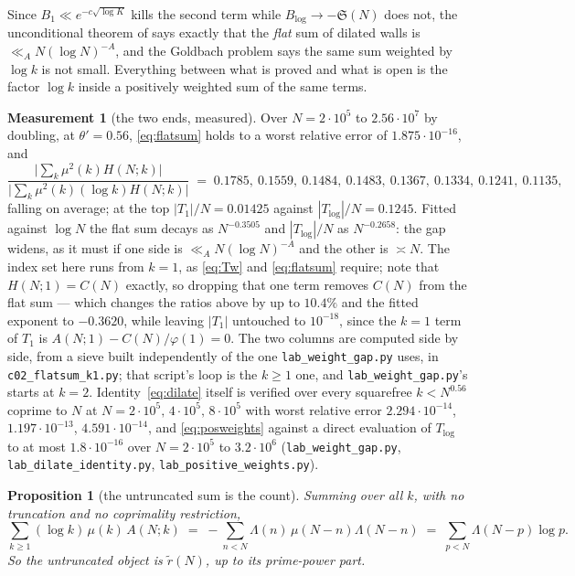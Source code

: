 \documentclass[11pt,a4paper]{article}
\theoremstyle{plain}
\newtheorem{proposition}[theorem]{Proposition}
\theoremstyle{definition}
\newtheorem{measurement}[theorem]{Measurement}
\theoremstyle{remark}
\renewcommand{\SS}{\mathfrak{S}}
\begin{document}
Since $B_1\ll e^{-c\sqrt{\log K}}$ kills the second term while
$B_{\log}\to-\SS(N)$ does not, the unconditional theorem of \cite{P1}
says exactly that the \emph{flat} sum of dilated walls is
$\ll_AN(\log N)^{-A}$, and the Goldbach problem says the same sum
weighted by $\log k$ is not small. Everything between what is proved
and what is open is the factor $\log k$ inside a positively weighted
sum of the same terms.

\begin{measurement}[the two ends, measured]\label{meas:flatsum}
Over $N=2\cdot10^5$ to $2.56\cdot10^7$ by doubling, at
$\theta'=0.56$, \eqref{eq:flatsum} holds to a worst relative error of
$1.875\cdot10^{-16}$, and
\[
  \frac{\bigl|\sum_k\mu^2(k)H(N;k)\bigr|}{\bigl|\sum_k\mu^2(k)(\log k)H(N;k)\bigr|}
  \;=\;0.1785,\ 0.1559,\ 0.1484,\ 0.1483,\ 0.1367,\ 0.1334,\
       0.1241,\ 0.1135,
\]
falling on average; at the top $|T_1|/N=0.01425$ against
$|T_{\log}|/N=0.1245$. Fitted against $\log N$ the flat sum decays as
$N^{-0.3505}$ and $|T_{\log}|/N$ as $N^{-0.2658}$: the gap widens, as
it must if one side is $\ll_AN(\log N)^{-A}$ and the other is
$\asymp N$. The index set here runs from $k=1$, as \eqref{eq:Tw} and
\eqref{eq:flatsum} require; note that $H(N;1)=C(N)$ exactly, so
dropping that one term removes $C(N)$ from the flat sum --- which
changes the ratios above by up to $10.4\%$ and the fitted exponent to
$-0.3620$, while leaving $|T_1|$ untouched to $10^{-18}$, since the
$k=1$ term of $T_1$ is $A(N;1)-C(N)/\varphi(1)=0$. The two columns are
computed side by side, from a sieve built independently of the one
\texttt{lab\_weight\_gap.py} uses, in
\texttt{c02\_flatsum\_k1.py}; that script's loop is the $k\ge1$ one,
and \texttt{lab\_weight\_gap.py}'s starts at $k=2$. Identity~\eqref{eq:dilate} itself is verified over every
squarefree $k<N^{0.56}$ coprime to $N$ at
$N=2\cdot10^5,\,4\cdot10^5,\,8\cdot10^5$ with worst relative error
$2.294\cdot10^{-14}$, $1.197\cdot10^{-13}$, $4.591\cdot10^{-14}$, and
\eqref{eq:posweights} against a direct evaluation of $T_{\log}$ to at
most $1.8\cdot10^{-16}$ over $N=2\cdot10^5$ to $3.2\cdot10^6$
(\texttt{lab\_weight\_gap.py}, \texttt{lab\_dilate\_identity.py},
\texttt{lab\_positive\_weights.py}).
\end{measurement}

\begin{proposition}[the untruncated sum is the count]%
\label{prop:untrunc}
Summing over \emph{all} $k$, with no truncation and no coprimality
restriction,
\begin{equation}\label{eq:untrunc}
  \sum_{k\ge1}(\log k)\,\mu(k)\,A(N;k)
   \;=\;-\sum_{n<N}\Lambda(n)\,\mu(N-n)\Lambda(N-n)
   \;=\;\sum_{p<N}\Lambda(N-p)\log p .
\end{equation}
So the untruncated object \emph{is} $\tilde r(N)$, up to its
prime-power part.
\end{proposition}
\end{document}
